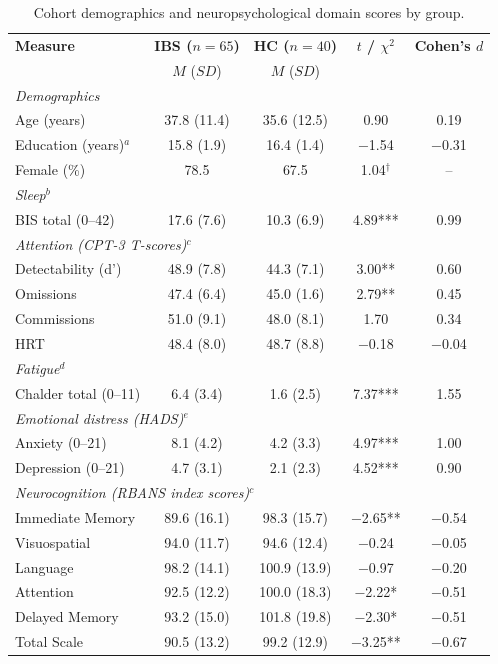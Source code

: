 \documentclass[11pt,a4paper]{article}
\begin{document}
\begin{table}[H]
\centering
\caption{Cohort demographics and neuropsychological domain scores by group.}
\label{tab:demographics}
\small
\begin{tabularx}{\textwidth}{Xcccc}
\toprule
\textbf{Measure} & \textbf{IBS ($n = 65$)} & \textbf{HC ($n = 40$)} & \textbf{$t$ / $\chi^2$} & \textbf{Cohen's $d$} \\
 & $M$ ($SD$) & $M$ ($SD$) & & \\
\midrule
\multicolumn{5}{l}{\textit{Demographics}} \\
\quad Age (years) & 37.8 (11.4) & 35.6 (12.5) & 0.90 & 0.19 \\
\quad Education (years)$^{a}$ & 15.8 (1.9) & 16.4 (1.4) & $-$1.54 & $-$0.31 \\
\quad Female (\%) & 78.5 & 67.5 & 1.04$^{\dagger}$ & -- \\
\midrule
\multicolumn{5}{l}{\textit{Sleep}$^{b}$} \\
\quad BIS total (0--42) & 17.6 (7.6) & 10.3 (6.9) & 4.89*** & 0.99 \\
\midrule
\multicolumn{5}{l}{\textit{Attention (CPT-3 T-scores)}$^{c}$} \\
\quad Detectability (d') & 48.9 (7.8) & 44.3 (7.1) & 3.00** & 0.60 \\
\quad Omissions & 47.4 (6.4) & 45.0 (1.6) & 2.79** & 0.45 \\
\quad Commissions & 51.0 (9.1) & 48.0 (8.1) & 1.70 & 0.34 \\
\quad HRT & 48.4 (8.0) & 48.7 (8.8) & $-$0.18 & $-$0.04 \\
\midrule
\multicolumn{5}{l}{\textit{Fatigue}$^{d}$} \\
\quad Chalder total (0--11) & 6.4 (3.4) & 1.6 (2.5) & 7.37*** & 1.55 \\
\midrule
\multicolumn{5}{l}{\textit{Emotional distress (HADS)}$^{e}$} \\
\quad Anxiety (0--21) & 8.1 (4.2) & 4.2 (3.3) & 4.97*** & 1.00 \\
\quad Depression (0--21) & 4.7 (3.1) & 2.1 (2.3) & 4.52*** & 0.90 \\
\midrule
\multicolumn{5}{l}{\textit{Neurocognition (RBANS index scores)}$^{c}$} \\
\quad Immediate Memory & 89.6 (16.1) & 98.3 (15.7) & $-$2.65** & $-$0.54 \\
\quad Visuospatial & 94.0 (11.7) & 94.6 (12.4) & $-$0.24 & $-$0.05 \\
\quad Language & 98.2 (14.1) & 100.9 (13.9) & $-$0.97 & $-$0.20 \\
\quad Attention & 92.5 (12.2) & 100.0 (18.3) & $-$2.22* & $-$0.51 \\
\quad Delayed Memory & 93.2 (15.0) & 101.8 (19.8) & $-$2.30* & $-$0.51 \\
\quad Total Scale & 90.5 (13.2) & 99.2 (12.9) & $-$3.25** & $-$0.67 \\
\bottomrule
\end{tabularx}


\end{table}
\end{document}
